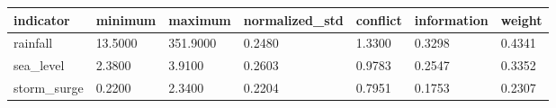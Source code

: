 \begin{tabular}{lllllll}
\hline
indicator & minimum & maximum & normalized\_std & conflict & information & weight \\
\hline
rainfall & 13.5000 & 351.9000 & 0.2480 & 1.3300 & 0.3298 & 0.4341 \\
sea\_level & 2.3800 & 3.9100 & 0.2603 & 0.9783 & 0.2547 & 0.3352 \\
storm\_surge & 0.2200 & 2.3400 & 0.2204 & 0.7951 & 0.1753 & 0.2307 \\
\hline
\end{tabular}